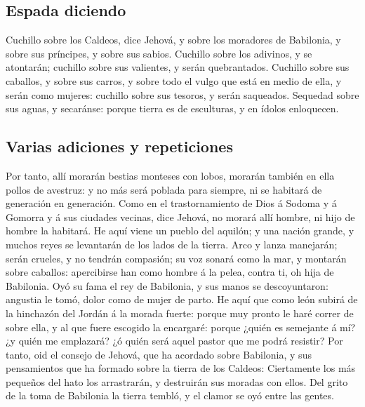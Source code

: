 \hypertarget{espada-diciendo}{%
\subsection{Espada diciendo}\label{espada-diciendo}}

 Cuchillo sobre los Caldeos, dice Jehová, y sobre los
moradores de Babilonia, y sobre sus príncipes, y sobre sus sabios.
 Cuchillo sobre los adivinos, y se atontarán; cuchillo
sobre sus valientes, y serán quebrantados.  Cuchillo
sobre sus caballos, y sobre sus carros, y sobre todo el vulgo que está
en medio de ella, y serán como mujeres: cuchillo sobre sus tesoros, y
serán saqueados.  Sequedad sobre sus aguas, y secaránse:
porque tierra es de esculturas, y en ídolos enloquecen.

\hypertarget{varias-adiciones-y-repeticiones}{%
\subsection{Varias adiciones y
repeticiones}\label{varias-adiciones-y-repeticiones}}

 Por tanto, allí morarán bestias monteses con lobos,
morarán también en ella pollos de avestruz: y no más será poblada para
siempre, ni se habitará de generación en generación. 
Como en el trastornamiento de Dios á Sodoma y á Gomorra y á sus ciudades
vecinas, dice Jehová, no morará allí hombre, ni hijo de hombre la
habitará.  He aquí viene un pueblo del aquilón; y una
nación grande, y muchos reyes se levantarán de los lados de la tierra.
 Arco y lanza manejarán; serán crueles, y no tendrán
compasión; su voz sonará como la mar, y montarán sobre caballos:
apercibirse han como hombre á la pelea, contra ti, oh hija de Babilonia.
 Oyó su fama el rey de Babilonia, y sus manos se
descoyuntaron: angustia le tomó, dolor como de mujer de parto.
 He aquí que como león subirá de la hinchazón del Jordán
á la morada fuerte: porque muy pronto le haré correr de sobre ella, y al
que fuere escogido la encargaré: porque ¿quién es semejante á mí? ¿y
quién me emplazará? ¿ó quién será aquel pastor que me podrá resistir?
 Por tanto, oid el consejo de Jehová, que ha acordado
sobre Babilonia, y sus pensamientos que ha formado sobre la tierra de
los Caldeos: Ciertamente los más pequeños del hato los arrastrarán, y
destruirán sus moradas con ellos.  Del grito de la toma
de Babilonia la tierra tembló, y el clamor se oyó entre las gentes.

